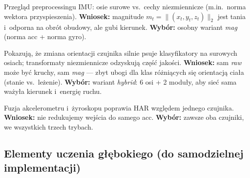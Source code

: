 \documentclass[12pt,a4paper]{article}
\begin{document}
\begin{description}[style=nextline, leftmargin=0.6em, font=\normalfont]
  \item[\cite{figo2010preprocessing} --- Figo i~in., 2010]
  Przegląd preprocessingu IMU: osie surowe vs.\ cechy niezmiennicze (m.in.\ norma wektora przyspieszenia). \textbf{Wniosek:} magnitude $m_t=\lVert (x_t,y_t,z_t)\rVert_2$ jest tania i~odporna na obrót obudowy, ale gubi kierunek. \textbf{Wybór:} osobny wariant \textit{mag} (norma acc + norma gyro).

  \item[\cite{yurtman2017orientation} --- Yurtman, Barshan, Sensors 2017]
  Pokazują, że zmiana orientacji czujnika silnie psuje klasyfikatory na surowych osiach; transformaty niezmiennicze odzyskują część jakości. \textbf{Wniosek:} sam \textit{raw} może być kruchy, sam \textit{mag} --- zbyt ubogi dla klas różniących się orientacją ciała (stanie vs.\ leżenie). \textbf{Wybór:} wariant \textit{hybrid}: 6 osi + 2 moduły, aby sieć sama ważyła kierunek i~energię ruchu.

  \item[\cite{shoaiB2014fusion} --- Shoaib i~in., 2014]
  Fuzja akcelerometru i~żyroskopu poprawia HAR względem jednego czujnika. \textbf{Wniosek:} nie redukujemy wejścia do samego acc. \textbf{Wybór:} zawsze oba czujniki, we wszystkich trzech trybach.
\end{description}

\subsection{Elementy uczenia głębokiego (do samodzielnej implementacji)}
\end{document}
